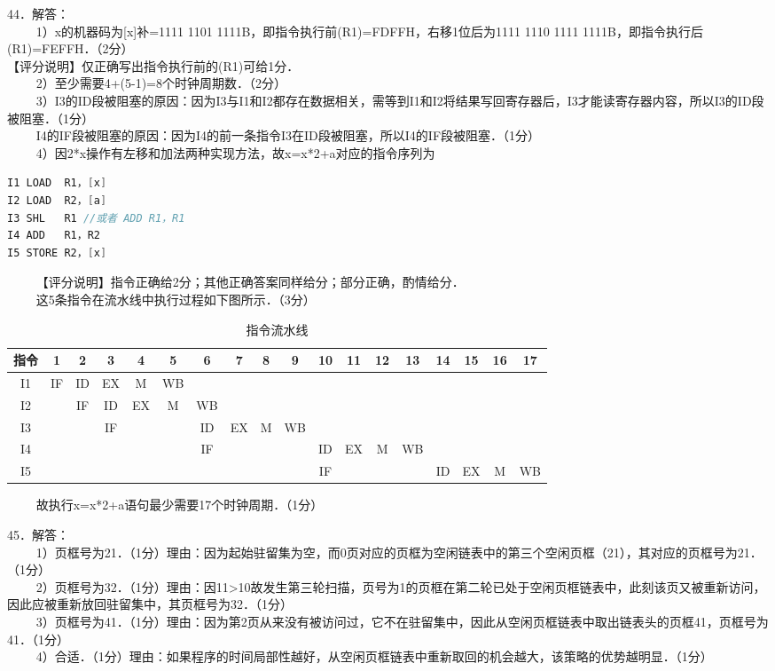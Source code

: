44．解答： \\
$\qquad$ 1）x的机器码为[x]补=1111 1101 1111B，即指令执行前(R1)=FDFFH，右移1位后为1111 1110 1111 1111B，即指令执行后(R1)=FEFFH．（2分） \\
【评分说明】仅正确写出指令执行前的(R1)可给1分． \\
$\qquad$ 2）至少需要4+(5-1)=8个时钟周期数．（2分） \\
$\qquad$ 3）I3的ID段被阻塞的原因：因为I3与I1和I2都存在数据相关，需等到I1和I2将结果写回寄存器后，I3才能读寄存器内容，所以I3的ID段被阻塞．（1分） \\
$\qquad$ I4的IF段被阻塞的原因：因为I4的前一条指令I3在ID段被阻塞，所以I4的IF段被阻塞．（1分） \\
$\qquad$ 4）因2*x操作有左移和加法两种实现方法，故x=x*2+a对应的指令序列为 \\
\begin{lstlisting}[language=cpp]
I1 LOAD  R1，[x]
I2 LOAD  R2，[a]
I3 SHL   R1 //或者 ADD R1，R1
I4 ADD   R1，R2
I5 STORE R2，[x]
\end{lstlisting}
$\qquad$ 【评分说明】指令正确给2分；其他正确答案同样给分；部分正确，酌情给分． \\
$\qquad$ 这5条指令在流水线中执行过程如下图所示．（3分）
\begin{table}[ht]
\centering
\caption{指令流水线}\label{CSN12_tab8}
\begin{tabular}{|c|c|c|c|c|c|c|c|c|c|c|c|c|c|c|c|c|c|}
\hline
指令 & 1 & 2 & 3 & 4 & 5 & 6 & 7 & 8 & 9 & 10 & 11 & 12 & 13 & 14 & 15 & 16 & 17 \\
\hline
I1 & IF & ID & EX & M & WB &  &  &  &  &  &  &  &  &  &  &  &  \\
\hline
I2 &  & IF & ID & EX & M & WB &  &  &  &  &  &  &  &  &  &  &  \\
\hline
I3 &  &  & IF &  &  & ID & EX & M & WB &  &  &  &  &  &  &  &  \\
\hline
I4 &  &  &  &  &  & IF &  &  &  & ID & EX & M & WB & &  &  &  \\
\hline
I5 &  &  &  &  &  &  &  &  &  & IF &  &  &  & ID & EX & M & WB \\
\hline
\end{tabular}
\end{table}
$\qquad$ 故执行x=x*2+a语句最少需要17个时钟周期．（1分）

45．解答：\\
$\qquad$ 1）页框号为21．（1分）理由：因为起始驻留集为空，而0页对应的页框为空闲链表中的第三个空闲页框（21），其对应的页框号为21．（1分） \\
$\qquad$ 2）页框号为32．（1分）理由：因11>10故发生第三轮扫描，页号为1的页框在第二轮已处于空闲页框链表中，此刻该页又被重新访问，因此应被重新放回驻留集中，其页框号为32．（1分） \\
$\qquad$ 3）页框号为41．（1分）理由：因为第2页从来没有被访问过，它不在驻留集中，因此从空闲页框链表中取出链表头的页框41，页框号为41．（1分） \\
$\qquad$ 4）合适．（1分）理由：如果程序的时间局部性越好，从空闲页框链表中重新取回的机会越大，该策略的优势越明显．（1分）

